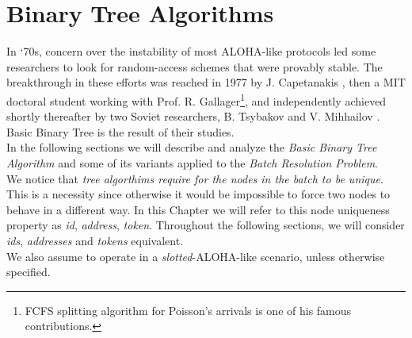 \documentclass[12pt,a4paper]{report}
\begin{document}
\section{Binary Tree Algorithms}
In `70s, concern over the instability of most ALOHA-like protocols led some researchers to look for random-access schemes that were provably stable. The breakthrough in these efforts was reached in 1977 by J.  Capetanakis  \cite{capetanakis77}, then a MIT doctoral student working with Prof. R. Gallager\footnote{FCFS splitting algorithm for Poisson's arrivals is one of his famous contributions.}, and independently achieved shortly thereafter by two Soviet researchers, B. Tsybakov and V. Mihhailov \cite{tsybakov}. Basic Binary Tree is the result of their studies.\\
In the following sections we will describe and analyze the \emph{Basic Binary Tree Algorithm} and some of its variants applied to the \emph{Batch Resolution Problem}.\\

We notice that \emph{tree algorthims require for the nodes in the batch to be unique}. This is a necessity since otherwise it would be impossible to force two nodes to behave in a different way. In this Chapter we will refer to this node uniqueness property as \emph{id}, \emph{address}, \emph{token}. Throughout the following sections, we will consider \emph{ids}, \emph{addresses} and \emph{tokens} equivalent.\\

We also assume to operate in a \emph{slotted}-ALOHA-like scenario, unless otherwise specified.
\end{document}
